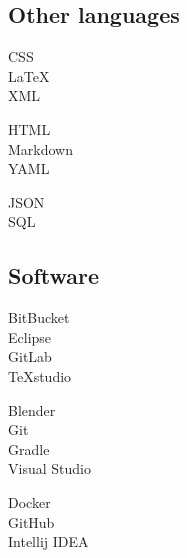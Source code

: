 \documentclass[curriculum-vitae-eng]{subfiles}
\begin{document}
		\subsection*{Other languages}
			\begin{minipage}[t]{.3\textwidth}
				CSS \hfill {}\\
				\LaTeX \hfill {}\\
				XML \hfill {}\\ %
			\end{minipage}
			\hfill
			\begin{minipage}[t]{.3\textwidth}
				HTML \hfill {}\\
				Markdown \hfill {}\\
				YAML \hfill {}\\ %
			\end{minipage}
			\hfill
			\begin{minipage}[t]{.3\textwidth}
				JSON \hfill {}\\
				SQL \hfill {}\\ %
			\end{minipage}
		
		\subsection*{Software}
			\begin{minipage}[t]{.3\textwidth}
				BitBucket \hfill {}\\
				Eclipse \hfill {}\\
				GitLab \hfill {}\\
				TeXstudio \hfill {}\\  %
			\end{minipage}
			\hfill
			\begin{minipage}[t]{.3\textwidth}
				Blender \hfill {}\\
				Git \hfill {}\\
				Gradle \hfill {}\\
				Visual Studio \hfill {}\\  %
			\end{minipage}
			\hfill
			\begin{minipage}[t]{.3\textwidth}
				Docker \hfill {}\\
				GitHub \hfill {}\\
				Intellij IDEA \hfill {}\\ %
			\end{minipage}
\end{document}
